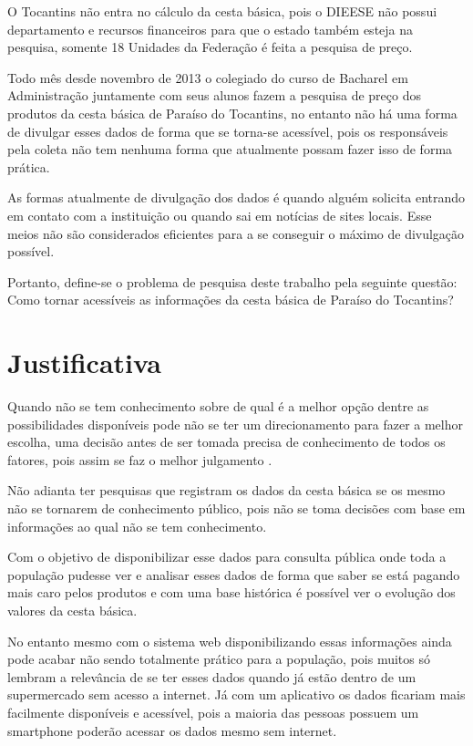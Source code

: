 \documentclass{ifto-tex}
\begin{document}
		O Tocantins não entra no cálculo da cesta básica, pois o DIEESE não possui departamento e recursos financeiros para que o estado também esteja na pesquisa, somente 18 Unidades da Federação é feita a pesquisa de preço.
		
		Todo mês desde novembro de 2013 o colegiado do curso de Bacharel em Administração juntamente com seus alunos fazem a pesquisa de preço dos produtos da cesta básica de Paraíso do Tocantins, no entanto não há uma forma de divulgar esses dados de forma que se torna-se acessível, pois os responsáveis pela coleta não tem nenhuma forma que atualmente possam fazer isso de forma prática.
		
		As formas atualmente de divulgação dos dados é quando alguém solicita entrando em contato com a instituição ou quando sai em notícias de sites locais. Esse meios não são considerados eficientes para a se conseguir o máximo de divulgação possível.
		
		Portanto, define-se o problema de pesquisa deste trabalho pela seguinte questão: Como tornar acessíveis as informações da cesta básica de Paraíso do Tocantins?
		
	
\chapter{Justificativa}
	
		Quando não se tem conhecimento sobre de qual é a melhor opção dentre as possibilidades disponíveis pode não se ter um direcionamento para fazer a melhor escolha, uma decisão antes de ser tomada precisa de conhecimento de todos os fatores, pois assim se faz o melhor julgamento \cite{bezerra2013efeito}.
		
		Não adianta ter pesquisas que registram os dados da cesta básica se os mesmo não se tornarem de conhecimento público, pois não se toma decisões com base em informações ao qual não se tem conhecimento.
		
		Com o objetivo de disponibilizar esse dados para consulta pública onde toda a população pudesse ver e analisar esses dados de forma que saber se está pagando mais caro pelos produtos e com uma base histórica é possível ver o evolução dos valores da cesta básica.
		
		No entanto mesmo com o sistema web disponibilizando essas informações ainda pode acabar não sendo totalmente prático para a população, pois muitos só lembram a relevância de se ter esses dados quando já estão dentro de um supermercado sem acesso a internet. Já com um aplicativo os dados ficariam mais facilmente disponíveis e acessível, pois a maioria das pessoas possuem um smartphone poderão acessar os dados mesmo sem internet.
		
\end{document}
